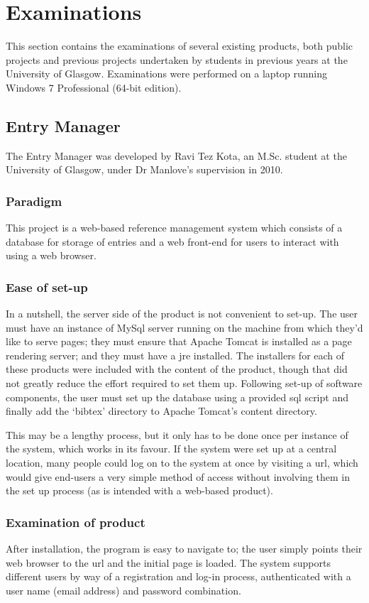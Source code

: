 \section{Examinations}
This section contains the examinations of several existing products, both public projects and previous projects undertaken by students in previous years at the University of Glasgow.  Examinations were performed on a laptop running Windows 7 Professional (64-bit edition).

\subsection{\bibtex{} Entry Manager}
The \bibtex{} Entry Manager was developed by Ravi Tez Kota, an M.Sc. student at the University of Glasgow, under Dr Manlove's supervision in 2010.

\subsubsection{Paradigm}
This project is a web-based reference management system which consists of a database for storage of entries and a web front-end for users to interact with using a web browser.

\subsubsection{Ease of set-up}
In a nutshell, the server side of the product is not convenient to set-up.  The user must have an instance of MySql server running on the machine from which they'd like to serve pages; they must ensure that Apache Tomcat is installed as a page rendering server; and they must have a \gls{jre} installed.  The installers for each of these products were included with the content of the product, though that did not greatly reduce the effort required to set them up.  Following set-up of software components, the user must set up the database using a provided \gls{sql} script and finally add the `bibtex' directory to Apache Tomcat's content directory.  

This may be a lengthy process, but it only has to be done once per instance of the system, which works in its favour. If the system were set up at a central location, many people could log on to the system at once by visiting a \gls{url}, which would give end-users a very simple method of access without involving them in the set up process (as is intended with a web-based product).

\subsubsection{Examination of product}
After installation, the program is easy to navigate to; the user simply points their web browser to the \gls{url} and the initial page is loaded. The system supports different users by way of a registration and log-in process, authenticated with a user name (email address) and password combination.

